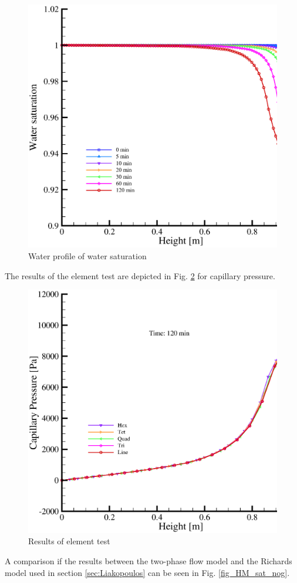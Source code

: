 \begin{figure}[htb!]
\begin{center}
\includegraphics[scale=0.38]{HH/figures/liak_sat_profile.eps}
\end{center}
\caption{Water profile of water saturation}
\label{liak:p_sat}
\end{figure}

The results of the element test are depicted in Fig. \ref{liak:p_pce} for capillary pressure.

\begin{figure}[htb!]
\begin{center}
\includegraphics[scale=0.38]{HH/figures/liak_pc_profile_eles.eps}
\end{center}
\caption{Results of element test}
\label{liak:p_pce}
\end{figure}

A comparison if the results between the two-phase flow model and the Richards model used in section \ref{sec:Liakopoulos}
can be seen in Fig. \ref{fig_HM_sat_nog}. 